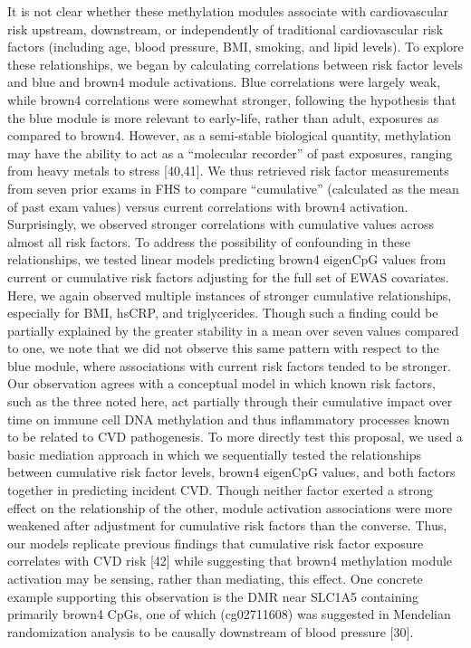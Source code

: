 \documentclass[]{article}
\theoremstyle{definition}
\theoremstyle{definition}
\theoremstyle{definition}
\theoremstyle{remark}
\begin{document}
It is not clear whether these methylation modules associate with
cardiovascular risk upstream, downstream, or independently of
traditional cardiovascular risk factors (including age, blood pressure,
BMI, smoking, and lipid levels). To explore these relationships, we
began by calculating correlations between risk factor levels and blue
and brown4 module activations. Blue correlations were largely weak,
while brown4 correlations were somewhat stronger, following the
hypothesis that the blue module is more relevant to early-life, rather
than adult, exposures as compared to brown4. However, as a semi-stable
biological quantity, methylation may have the ability to act as a
``molecular recorder'' of past exposures, ranging from heavy metals to
stress {[}40,41{]}. We thus retrieved risk factor measurements from
seven prior exams in FHS to compare ``cumulative'' (calculated as the
mean of past exam values) versus current correlations with brown4
activation. Surprisingly, we observed stronger correlations with
cumulative values across almost all risk factors. To address the
possibility of confounding in these relationships, we tested linear
models predicting brown4 eigenCpG values from current or cumulative risk
factors adjusting for the full set of EWAS covariates. Here, we again
observed multiple instances of stronger cumulative relationships,
especially for BMI, hsCRP, and triglycerides. Though such a finding
could be partially explained by the greater stability in a mean over
seven values compared to one, we note that we did not observe this same
pattern with respect to the blue module, where associations with current
risk factors tended to be stronger. Our observation agrees with a
conceptual model in which known risk factors, such as the three noted
here, act partially through their cumulative impact over time on immune
cell DNA methylation and thus inflammatory processes known to be related
to CVD pathogenesis. To more directly test this proposal, we used a
basic mediation approach in which we sequentially tested the
relationships between cumulative risk factor levels, brown4 eigenCpG
values, and both factors together in predicting incident CVD. Though
neither factor exerted a strong effect on the relationship of the other,
module activation associations were more weakened after adjustment for
cumulative risk factors than the converse. Thus, our models replicate
previous findings that cumulative risk factor exposure correlates with
CVD risk {[}42{]} while suggesting that brown4 methylation module
activation may be sensing, rather than mediating, this effect. One
concrete example supporting this observation is the DMR near SLC1A5
containing primarily brown4 CpGs, one of which (cg02711608) was
suggested in Mendelian randomization analysis to be causally downstream
of blood pressure {[}30{]}.
\end{document}
